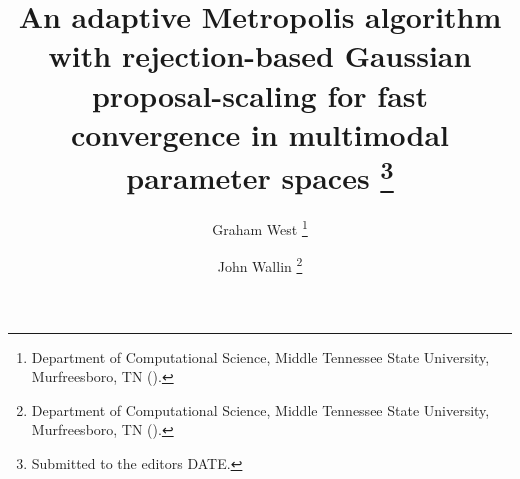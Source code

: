 

\usepackage{lipsum}
\usepackage{amsfonts}
\usepackage{graphicx}
\usepackage{epstopdf}
\usepackage{algorithmic}

\usepackage{textpos}
\usepackage{verbatim}
\usepackage{textcomp}
\usepackage{varwidth}
\ifpdf
\else
\fi

\usepackage{enumitem}

\newcommand{\creflastconjunction}{, and~}



\title{An adaptive Metropolis algorithm with rejection-based Gaussian proposal-scaling for fast convergence in multimodal parameter spaces \thanks{Submitted to the editors DATE.
}}

\author{Graham West \thanks{Department of Computational Science, Middle Tennessee State University, Murfreesboro, TN 
  ().}
\and John Wallin \thanks{Department of Computational Science, Middle Tennessee State University, Murfreesboro, TN ().}}

\usepackage{amsopn}
\DeclareMathOperator{\diag}{diag}


